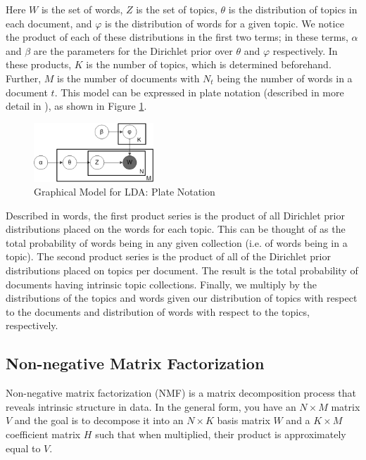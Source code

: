 \documentclass[10pt]{article}
\begin{document}
Here $W$ is the set of words, $Z$ is the set of topics, $\theta$ is the distribution of topics in each document, and $\varphi$ is the distribution of words for a given topic. We notice the product of each of these distributions in the first two terms; in these terms, $\alpha$ and $\beta$ are the parameters for the Dirichlet prior over $\theta$ and $\varphi$ respectively.  In these products, $K$ is the number of topics, which is determined beforehand.  Further, $M$ is the number of documents with $N_t$ being the number of words in a document $t$. This model can be expressed in plate notation (described in more detail in \cite{plate}), as shown in Figure \ref{lda-fig}.

\begin{figure}[H]
\centering
\includegraphics[width=0.4\textwidth, keepaspectratio]{Smoothed_LDA}
\caption{Graphical Model for LDA: Plate Notation \cite{LDA-pic}}
\label{lda-fig}
\end{figure}

Described in words, the first product series is the product of all Dirichlet prior distributions placed on the words for each topic.  This can be thought of as the total probability of words being in any given collection (i.e. of words being in a topic).  The second product series is the product of all of the Dirichlet prior distributions placed on topics per document.  The result is the total probability of documents having intrinsic topic collections.  Finally, we multiply by the distributions of the topics and words given our distribution of topics with respect to the documents and distribution of words with respect to the topics, respectively.

\subsection{Non-negative Matrix Factorization}

Non-negative matrix factorization (NMF) is a matrix decomposition process that reveals intrinsic structure in data.  In the general form, you have an $N \times M$ matrix $V$ and the goal is to decompose it into an $N \times K$ basis matrix $W$ and a $K \times M$ coefficient matrix $H$ such that when multiplied, their product is approximately equal to $V$.
\end{document}

